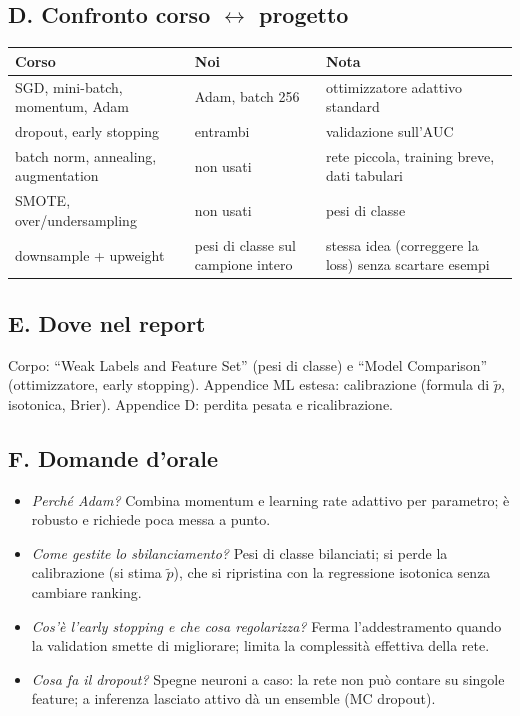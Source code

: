\documentclass[11pt,a4paper]{article}
\begin{document}
\subsection*{D. Confronto corso $\leftrightarrow$ progetto}
\begin{center}
\begin{tabular}{p{4.2cm}p{4.4cm}p{6.0cm}}
\toprule
Corso & Noi & Nota \\
\midrule
SGD, mini-batch, momentum, Adam & Adam, batch 256 & ottimizzatore adattivo standard \\
dropout, early stopping & entrambi & validazione sull'AUC \\
batch norm, annealing, augmentation & non usati & rete piccola, training breve, dati tabulari \\
SMOTE, over/undersampling & non usati & pesi di classe \\
downsample + upweight & pesi di classe sul campione intero & stessa idea (correggere la loss) senza scartare esempi \\
\bottomrule
\end{tabular}
\end{center}

\subsection*{E. Dove nel report}
Corpo: ``Weak Labels and Feature Set'' (pesi di classe) e ``Model Comparison'' (ottimizzatore, early stopping). Appendice ML estesa: calibrazione (formula di $\tilde p$, isotonica, Brier). Appendice D: perdita pesata e ricalibrazione.

\subsection*{F. Domande d'orale}
\begin{itemize}
\item \emph{Perch\'e Adam?} Combina momentum e learning rate adattivo per parametro; \`e robusto e richiede poca messa a punto.
\item \emph{Come gestite lo sbilanciamento?} Pesi di classe bilanciati; si perde la calibrazione (si stima $\tilde p$), che si ripristina con la regressione isotonica senza cambiare ranking.
\item \emph{Cos'\`e l'early stopping e che cosa regolarizza?} Ferma l'addestramento quando la validation smette di migliorare; limita la complessit\`a effettiva della rete.
\item \emph{Cosa fa il dropout?} Spegne neuroni a caso: la rete non pu\`o contare su singole feature; a inferenza lasciato attivo d\`a un ensemble (MC dropout).
\end{itemize}
\end{document}
